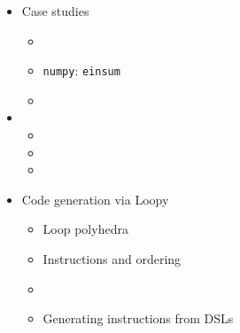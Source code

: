 \documentclass[english,compress]{beamer}
\begin{document}
\begin{frame}
\begin{columns}
    \begin{itemize}
    \item Case studies
      \begin{itemize}
        \item {}
        \item \texttt{numpy}: \texttt{einsum}
        \item {}
      \end{itemize}
    \item {}
      \begin{itemize}
        \item {}
        \item {}
        \item {}
      \end{itemize}
    \item Code generation via Loopy
      \begin{itemize}
        \item Loop polyhedra
        \item Instructions and ordering
        \item {}
        \item Generating instructions from DSLs
      \end{itemize}
    \end{itemize}
  \end{columns}
\end{frame}
\end{document}

